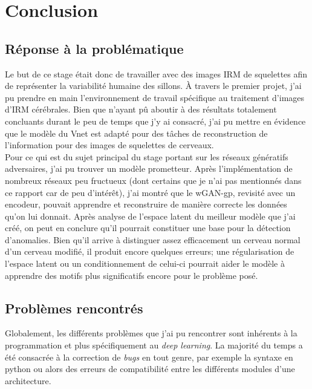 \documentclass[12pt, oneside, a4paper, titlepage]{article}
\begin{document}
\newpage

\section{Conclusion}

\subsection{Réponse à la problématique}

Le but de ce stage était donc de travailler avec des images IRM de squelettes afin de représenter la variabilité humaine des sillons. À travers le premier projet, j'ai pu prendre en main l'environnement de travail spécifique au traitement d'images d'IRM cérébrales. Bien que n'ayant pû aboutir à des résultats totalement concluants durant le peu de temps que j'y ai consacré, j'ai pu mettre en évidence que le modèle du Vnet est adapté pour des tâches de reconstruction de l'information pour des images de squelettes de cerveaux. \\

Pour ce qui est du sujet principal du stage portant sur les réseaux génératifs adversaires, j'ai pu trouver un modèle prometteur. Après l'implémentation de nombreux réseaux peu fructueux (dont certains que je n'ai pas mentionnés dans ce rapport car de peu d'intérêt), j'ai montré que le wGAN-gp, revisité avec un encodeur, pouvait apprendre et reconstruire de manière correcte les données qu'on lui donnait. Après analyse de l'espace latent du meilleur modèle que j'ai créé, on peut en conclure qu'il pourrait constituer une base pour la détection d'anomalies. Bien qu'il arrive à distinguer assez efficacement un cerveau normal d'un cerveau modifié, il produit encore quelques erreurs; une régularisation de l'espace latent ou un conditionnement de celui-ci pourrait aider le modèle à apprendre des motifs plus significatifs encore pour le problème posé. 

\subsection{Problèmes rencontrés}

Globalement, les différents problèmes que j'ai pu rencontrer sont inhérents à la programmation et plus spécifiquement au \textit{deep learning}. La majorité du temps a été consacrée à la correction de \textit{bugs} en tout genre, par exemple la syntaxe en python ou alors des erreurs de compatibilité entre les différents modules d'une architecture. 
\end{document}
